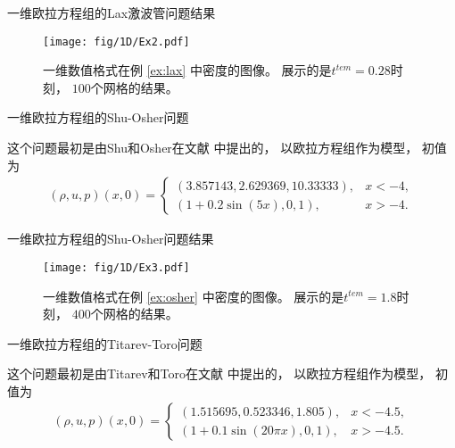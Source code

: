 \documentclass[aspectratio=169]{beamer}
\begin{document}
\begin{frame}{一维欧拉方程组的Lax激波管问题结果}
  
  \begin{figure}[htbp]
    \centering
    \texttt{[image: fig/1D/Ex2.pdf]}
    \caption{一维数值格式在例 \ref{ex:lax} 中密度的图像。
      展示的是$t^{tem} = 0.28$时刻，
      $100$个网格的结果。
    }
    \label{fig:2_1}
  \end{figure}
  
\end{frame}

\begin{frame}{一维欧拉方程组的Shu-Osher问题}
  
  \begin{example}
    \label{ex:osher}
    这个问题最初是由Shu和Osher在文献 \citep{ShuOsherProblem} 中提出的，
    以欧拉方程组作为模型，
    初值为
    \begin{equation*}
      \begin{aligned}
        (\rho,u,p)(x,0)=
        \begin{cases}
          (3.857143,2.629369,10.33333), & x<-4,  \\
          (1 + 0.2\sin(5 x),0,1),       & x>-4.
        \end{cases}
      \end{aligned}
    \end{equation*}
  \end{example}
  
\end{frame}

\begin{frame}{一维欧拉方程组的Shu-Osher问题结果}
  
  \begin{figure}[htbp]
    \centering
    \texttt{[image: fig/1D/Ex3.pdf]}
    \caption{一维数值格式在例 \ref{ex:osher} 中密度的图像。
      展示的是$t^{tem} = 1.8$时刻，
      $400$个网格的结果。
    }
    \label{fig:3_1}
  \end{figure}
  
\end{frame}

\begin{frame}{一维欧拉方程组的Titarev-Toro问题}
  
  \begin{example}
    \label{ex:toro}
    这个问题最初是由Titarev和Toro在文献 \citep{ToroProblem} 中提出的，
    以欧拉方程组作为模型，
    初值为
    \begin{equation*}
      \begin{aligned}
        (\rho, u, p)(x,0)=
        \begin{cases}
          (1.515695,0.523346,1.805),  & x<-4.5,  \\
          (1 + 0.1\sin(20\pi x),0,1), & x>-4.5.
        \end{cases}
      \end{aligned}
    \end{equation*}
  \end{example}
  
\end{frame}
\end{document}
